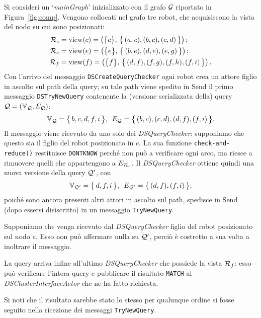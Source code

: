 \begin{example}
Si consideri un `\emph{mainGraph}' inizializzato con il
grafo $\mathcal{G}$ riportato in Figura~\ref{fig:comp}.
Vengono collocati nel grafo tre robot, che acquisiscono
la vista del nodo su cui sono posizionati:
\begin{align*}
  \mathcal{R}_c &= \mathrm{view}(c) = \left(\bigl\{c\bigr\},\,
  \bigl\{\,(a,c), (b,c), (c,d)\,\bigr\}\right); \\
  \mathcal{R}_e &= \mathrm{view}(e) = \left(\bigl\{e\bigr\},\,
  \bigl\{\,(b,e), (d,e), (e,g)\,\bigr\}\right); \\
  \mathcal{R}_f &= \mathrm{view}(f) = \left(\bigl\{f\bigr\},\,
  \bigl\{\,(d,f), (f,g), (f,h), (f,i)\,\bigr\}\right).
\end{align*}
Con l'arrivo del messaggio \texttt{DSCreateQueryChecker}
ogni robot crea un attore figlio in ascolto sul path
della query; su tale path viene spedito in Send il primo
messaggio \texttt{DSTryNewQuery} contenente la (versione
serializzata della) query $\mathcal{Q} = (\mathbb{V}_{\mathcal{Q}}, E_{\mathcal{Q}})$:\[
\mathbb{V}_{\mathcal{Q}} = \bigl\{\,b, c, d, f, i\,\bigr\}, \ \,
E_{\mathcal{Q}} = \bigl\{\,(b,c),(c,d),(d,f),(f,i)\,\bigr\}.\]
Il messaggio viene ricevuto da uno solo dei
\emph{DSQueryChecker}: supponiamo che questo sia il figlio
del robot posizionato in $c$.
La sua funzione \texttt{check-and-reduce()} restituisce
\texttt{DONTKNOW} perché non può a verificare ogni
arco, ma riesce a rimuovere quelli che appartengono a $E_{\mathcal{R}_c}$.
Il \emph{DSQueryChecker} ottiene quindi una nuova versione
della query $\mathcal{Q}'$, con\[
\mathbb{V}_{\mathcal{Q}'} = \bigl\{\,d, f, i\,\bigr\}, \ \,
E_{\mathcal{Q}'} = \bigl\{\,(d,f),(f,i)\,\bigr\};\]
poiché sono ancora presenti altri attori in ascolto sul path,
spedisce in Send (dopo essersi disiscritto)
in un messaggio \texttt{TryNewQuery}.

Supponiamo che venga ricevuto dal \emph{DSQueryChecker}
figlio del robot posizionato sul nodo $e$.
Esso non può affermare nulla su $\mathcal{Q}'$, perciò è
costretto a sua volta a inoltrare il messaggio.

La query arriva infine all'ultimo \emph{DSQueryChecker} che
possiede la vista $\mathcal{R}_f$: esso può verificare l'intera query
e pubblicare il risultato \texttt{MATCH} al
\emph{DSClusterInterfaceActor} che ne ha fatto richiesta.

Si noti che il risultato sarebbe stato lo stesso per
qualunque ordine si fosse seguito nella ricezione dei messaggi
\texttt{TryNewQuery}.
\end{example}
